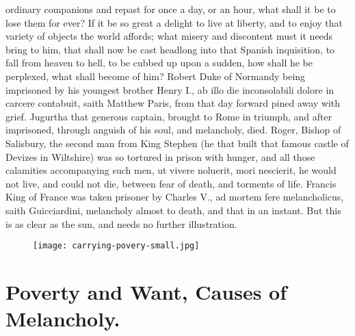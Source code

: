 {ordinary companions and repast for once a day, or an hour, what shall
it be to lose them for ever? If it be so great a delight to live at
liberty, and to enjoy that variety of objects the world affords; what
misery and discontent must it needs bring to him, that shall now be
cast headlong into that Spanish inquisition, to fall from heaven to
hell, to be cubbed up upon a sudden, how shall he be perplexed, what
shall become of him? Robert Duke of Normandy being imprisoned by
his youngest brother Henry I., ab illo die inconsolabili dolore in
carcere contabuit, saith Matthew Paris, from that day forward pined
away with grief. Jugurtha that generous captain, brought to Rome
in triumph, and after imprisoned, through anguish of his soul, and
melancholy, died. Roger, Bishop of Salisbury, the second man from
King Stephen (he that built that famous castle of Devizes in
Wiltshire) was so tortured in prison with hunger, and all those
calamities accompanying such men, ut vivere noluerit, mori
nescierit, he would not live, and could not die, between fear of death,
and torments of life. Francis King of France was taken prisoner by
Charles V., ad mortem fere melancholicus, saith Guicciardini,
melancholy almost to death, and that in an instant. But this is as
clear as the sun, and needs no further illustration.

\cleartoleftpage{}
\begin{figure}[p]
  \begingroup
  \centering
  \texttt{[image: carrying-povery-small.jpg]}
  \label{fig:povertyriches}
\end{figure}

\clearpage{}
\thispagestyle{titleontop}
\section{Poverty and Want, Causes of Melancholy.}\label{sec:poverty-and-want}

}

